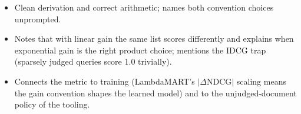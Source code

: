 \begin{interviewq}

\goodgreat
\begin{itemize}
    \item {} Clean derivation and correct arithmetic; names both convention choices unprompted.
    \item {} Notes that with linear gain the same list scores differently and explains when exponential gain is the right product choice; mentions the IDCG trap (sparsely judged queries score 1.0 trivially).
    \item {} Connects the metric to training (LambdaMART's $|\Delta \mathrm{NDCG}|$ scaling means the gain convention shapes the learned model) and to the unjudged-document policy of the tooling.
\end{itemize}

\end{interviewq}

